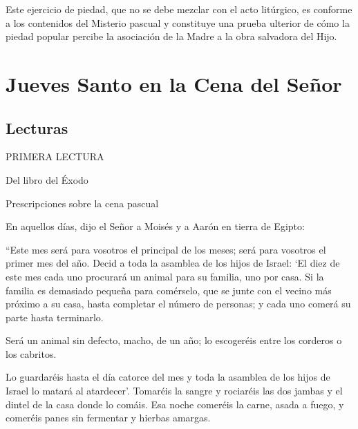 			\begin{bodyintro}Este ejercicio de piedad, que no se debe mezclar con el acto litúrgico, es conforme a los contenidos del Misterio pascual y constituye una prueba ulterior de cómo la piedad popular percibe la asociación de la Madre a la obra salvadora del Hijo.\end{bodyintro}
			
			\chapter{Jueves Santo en la Cena del Señor}
			
			\section{Lecturas}
			
			\begin{readtitle}PRIMERA LECTURA\end{readtitle}
			
			\begin{readbook}Del libro del Éxodo \end{readbook}
			
			\begin{readtheme}Prescripciones sobre la cena pascual\end{readtheme}
			
			\begin{readbody}En aquellos días, dijo el Señor a Moisés y a Aarón en tierra de Egipto: \end{readbody}
			
			\begin{readtalk}“Este mes será para vosotros el principal de los meses; será para vosotros el primer mes del año. Decid a toda la asamblea de los hijos de Israel: ‘El diez de este mes cada uno procurará un animal para su familia, uno por casa. Si la familia es demasiado pequeña para comérselo, que se junte con el vecino más próximo a su casa, hasta completar el número de personas; y cada uno comerá su parte hasta terminarlo. \end{readtalk}
			
			\begin{readtalk}Será un animal sin defecto, macho, de un año; lo escogeréis entre los corderos o los cabritos. \end{readtalk}
			
			\begin{readtalk}Lo guardaréis hasta el día catorce del mes y toda la asamblea de los hijos de Israel lo matará al atardecer’. Tomaréis la sangre y rociaréis las dos jambas y el dintel de la casa donde lo comáis. Esa noche comeréis la carne, asada a fuego, y comeréis panes sin fermentar y hierbas amargas. \end{readtalk}
			
